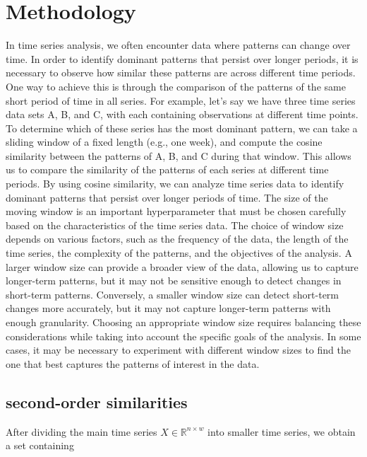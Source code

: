 \documentclass[twoside,11pt]{article}
\begin{document}
\section{Methodology}
In time series analysis, we often encounter data where patterns can change over time. In
order to identify dominant patterns that persist over longer periods, it is necessary to
observe how similar these patterns are across different time periods. One way to achieve
this is through the comparison of the patterns of the same short period of time in all series.
For example, let’s say we have three time series data sets A, B, and C, with each
containing observations at different time points. To determine which of these series has the
most dominant pattern, we can take a sliding window of a fixed length (e.g., one week),
and compute the cosine similarity between the patterns of A, B, and C during that window.
This allows us to compare the similarity of the patterns of each series at different time
periods. By using cosine similarity, we can analyze time series data to identify dominant
patterns that persist over longer periods of time.
The size of the moving window is an important hyperparameter that must be chosen
carefully based on the characteristics of the time series data. The choice of window size
depends on various factors, such as the frequency of the data, the length of the time series,
the complexity of the patterns, and the objectives of the analysis. A larger window size
can provide a broader view of the data, allowing us to capture longer-term patterns, but
it may not be sensitive enough to detect changes in short-term patterns. Conversely, a
smaller window size can detect short-term changes more accurately, but it may not capture
longer-term patterns with enough granularity. Choosing an appropriate window size requires
balancing these considerations while taking into account the specific goals of the analysis.
In some cases, it may be necessary to experiment with different window sizes to find the
one that best captures the patterns of interest in the data.

\subsection{second-order similarities}

After dividing the main time series \( X \in \mathbb{R}^{n \times w} \) into smaller time series, we obtain a set containing
\end{document}
